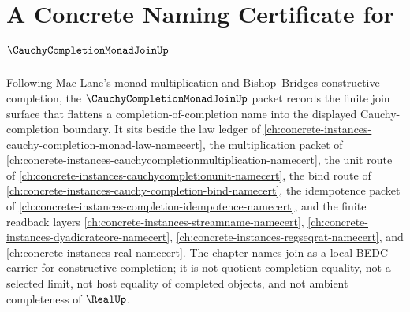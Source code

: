 \chapter{A Concrete Naming Certificate for $\CauchyCompletionMonadJoinUp$}
\label{ch:concrete-instances-cauchy-completion-monad-join-namecert}

Following Mac Lane's monad multiplication and Bishop--Bridges constructive completion, the $\CauchyCompletionMonadJoinUp$ packet records the finite join surface that flattens a completion-of-completion name into the displayed Cauchy-completion boundary. It sits beside the law ledger of \autoref{ch:concrete-instances-cauchy-completion-monad-law-namecert}, the multiplication packet of \autoref{ch:concrete-instances-cauchycompletionmultiplication-namecert}, the unit route of \autoref{ch:concrete-instances-cauchycompletionunit-namecert}, the bind route of \autoref{ch:concrete-instances-cauchy-completion-bind-namecert}, the idempotence packet of \autoref{ch:concrete-instances-completion-idempotence-namecert}, and the finite readback layers \autoref{ch:concrete-instances-streamname-namecert}, \autoref{ch:concrete-instances-dyadicratcore-namecert}, \autoref{ch:concrete-instances-regseqrat-namecert}, and \autoref{ch:concrete-instances-real-namecert}. The chapter names join as a local BEDC carrier for constructive completion; it is not quotient completion equality, not a selected limit, not host equality of completed objects, and not ambient completeness of $\RealUp$.

